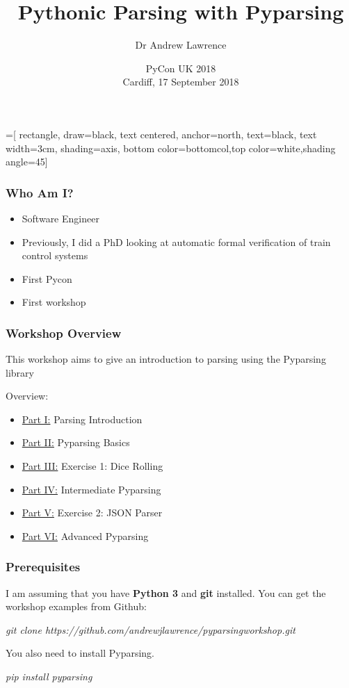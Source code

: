 \documentclass{beamer}
\title[Pythonic Parsing with Pyparsing]{Pythonic Parsing with Pyparsing}
\author[Dr Andrew Lawrence]{Dr Andrew Lawrence}
\date[PyCon UK, 17 September 2018]{PyCon UK 2018\\[1em]  Cardiff, 17 September 2018}
\begin{document}
=[
    rectangle,
    draw=black,
    text centered,
    anchor=north,
    text=black,
    text width=3cm,
    shading=axis,
    bottom color=bottomcol,top color=white,shading angle=45]


\begin{frame}
  \titlepage
\end{frame}

\begin{frame}
\frametitle{Who Am I?}
\begin{itemize}
\item Software Engineer
\pause
\item Previously, I did a PhD looking at automatic formal verification of train control systems
\pause
\item First Pycon
\pause
\item First workshop
\end{itemize}
\end{frame}

\begin{frame}

\frametitle{Workshop Overview}

\medskip
This workshop aims to give an introduction to parsing using the Pyparsing library

\medskip

Overview:

\begin{itemize}
  \item \underline{Part I:} Parsing Introduction
  \item \underline{Part II:} Pyparsing Basics
  \item \underline{Part III:} Exercise 1: Dice Rolling
  \item \underline{Part IV:} Intermediate Pyparsing
  \item \underline{Part V:} Exercise 2: JSON Parser
  \item \underline{Part VI:} Advanced Pyparsing
\end{itemize}
\end{frame}

\begin{frame}

\frametitle{Prerequisites}
I am assuming that you have \textbf{Python 3} and \textbf{git} installed. You can get the workshop examples from Github:
\begin{center}
\textit{git clone https://github.com/andrewjlawrence/pyparsingworkshop.git}
\end{center}
\bigskip
You also need to install Pyparsing. 
\begin{center}
\textit{pip install pyparsing}
\end{center}
\end{frame}
\end{document}
